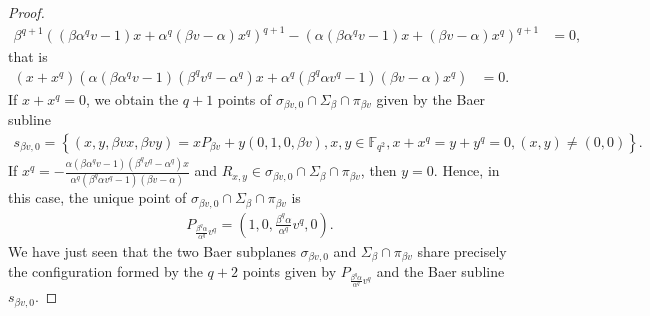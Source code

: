 \documentclass[11pt]{article}
\theoremstyle{definition}
\numberwithin{equation}{section}
\def\F{{\mathbb F}}
\begin{document}
\begin{proof}
\begin{align*}
\beta^{q+1} \left( \left(\beta \alpha^q v - 1\right) x + \alpha^q\left(\beta v - \alpha\right) x^q \right)^{q+1} - \left( \alpha\left(\beta \alpha^q v - 1\right) x + \left(\beta v -\alpha\right) x^q \right)^{q+1} & = 0,
\end{align*}
that is 
\begin{align*}
\left( x+x^q \right) \left( \alpha \left(\beta \alpha^q v - 1\right) \left( \beta^q v^q - \alpha^q \right) x + \alpha^q \left(\beta^q \alpha v^q - 1\right) \left(\beta v - \alpha\right) x^q  \right) & = 0.
\end{align*}
If $x + x^q = 0$, we obtain the $q+1$ points of $\sigma_{\beta v, 0} \cap \Sigma_{\beta} \cap \pi_{\beta v}$ given by the Baer subline
\begin{align*}
s_{\beta v, 0} = \left\{ (x,y, \beta v x, \beta v y) = x P_{\beta v} + y (0,1,0,\beta v), x, y \in \F_{q^2}, x+x^q = y + y^q = 0, (x, y) \ne (0,0) \right\}.
\end{align*} 
If $x^q = - \frac{\alpha \left(\beta \alpha^q v - 1\right) \left( \beta^q v^q - \alpha^q \right) x}{\alpha^q \left(\beta^q \alpha v^q - 1\right) \left(\beta v - \alpha\right)}
$ and $R_{x,y} \in \sigma_{\beta v, 0} \cap \Sigma_{\beta} \cap \pi_{\beta v}$, then $y = 0$. Hence, in this case, the unique point of $\sigma_{\beta v, 0} \cap \Sigma_{\beta} \cap \pi_{\beta v}$ is
\begin{align*}
P_{\frac{\beta^q \alpha}{\alpha^q} v^q} = \left(1,0,\frac{\beta^q \alpha}{\alpha^q} v^q, 0 \right).
\end{align*}
We have just seen that the two Baer subplanes $\sigma_{\beta v, 0}$ and $\Sigma_{\beta} \cap \pi_{\beta v}$ share precisely the configuration formed by the $q+2$ points given by $P_{\frac{\beta^q \alpha}{\alpha^q} v^q}$ and the Baer subline $s_{\beta v, 0}$.


\end{proof}
\end{document}
